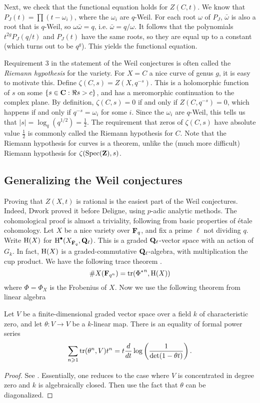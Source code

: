 Next, we check that the functional equation holds for $Z(C,t)$. We know that 
$P_J(t) = \prod (t-\omega_i)$, where the $\omega_i$ are $q$-Weil. For each 
root $\omega$ of $P_J$, $\bar\omega$ is also a root that is $q$-Weil, so 
$\omega \bar\omega = q$, i.e. $\bar\omega = q/\omega$. It follows that the 
polynomials $t^{2 g} P_J(q/t)$ and $P_J(t)$ have the same roots, so they are 
equal up to a constant (which turns out to be $q^g$). This yields the 
functional equation.

Requirement 3 in the statement of the Weil conjectures is often called the 
\emph{Riemann hypothesis} for the variety. For $X=C$ a nice curve of genus 
$g$, it is easy to motivate this. Define $\zeta(C,s) = Z(X,q^{-s})$. This is a 
holomorphic function of $s$ on some $\{s\in \mathbf{C}:\Re s>c\}$, and has a 
meromorphic continuation to the complex plane. By definition, 
$\zeta(C,s) = 0$ if and only if $Z(C,q^{-s}) = 0$, which happens if and only if 
$q^{-s} = \omega_i$ for some $i$. Since the $\omega_i$ are $q$-Weil, this tells 
us that $|s|=\log_q(q^{1/2}) = \frac 1 2$. The requirement that zeros of 
$\zeta(C,s)$ have absolute value $\frac 1 2$ is commonly called the Riemann 
hypothesis for $C$. Note that the Riemann hypothesis for curves is a theorem, 
unlike the (much more difficult) Riemann hypothesis for $\zeta(\operatorname{Spec}(\mathbf{Z}),s)$. 





\subsection{Generalizing the Weil conjectures}

Proving that $Z(X,t)$ is rational is the easiest part of the Weil conjectures. 
Indeed, Dwork proved it before Deligne, using $p$-adic analytic methods. The 
cohomological proof is almost a triviality, following from basic properties of 
\'etale cohomology. Let $X$ be a nice variety over $\mathbf{F}_q$, and fix a prime 
$\ell$ not dividing $q$. Write $\operatorname{H}(X)$ for 
$\operatorname{H}^\bullet(X_{\bar{\mathbf{F}}_q},\mathbf{Q}_\ell)$. This is a graded $\mathbf{Q}_\ell$-vector space 
with an action of $G_k$. In fact, $\operatorname{H}(X)$ is a graded-commutative 
$\mathbf{Q}_\ell$-algebra, with multiplication the cup product. We have the following 
trace theorem \cite[II.3.1]{de77}. 
\[
  \# X(\mathbf{F}_{q^n}) = \operatorname{tr}({\Phi^\ast}^n,\operatorname{H}(X)) 
\]
where $\Phi=\Phi_X$ is the Frobenius of $X$. Now we use the following theorem 
from linear algebra

\begin{theorem}\label{thm:graded-trace}
Let $V$ be a finite-dimensional graded vector space over a field $k$ of 
characteristic zero, and let $\theta:V\to V$ be a $k$-linear map. There is an 
equality of formal power series 
\[
  \sum_{n\geqslant 1} \operatorname{tr}(\theta^n, V) t^n = t\frac{d}{dt} \log\left(\frac{1}{\det(1-\theta t)}\right) \text{.}
\]
\end{theorem}
\begin{proof}
See \cite[II.3.3]{de77}. Essentially, one reduces to the case where $V$ 
is concentrated in degree zero and $k$ is algebraically closed. Then use 
the fact that $\theta$ can be diagonalized. 
\end{proof}

